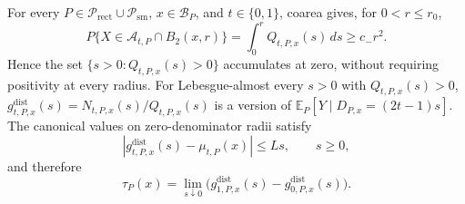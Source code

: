 For every \(P\in\mathcal{P}_{\mathrm{rect}}\cup\mathcal{P}_{\mathrm{sm}}\), \(x\in\mathcal{B}_P\), and \(t\in\{0,1\}\), coarea gives, for \(0<r\leq r_0\), \[P\{X\in\mathcal{A}_{t,P}\cap B_2(x,r)\}=\int_0^r Q_{t,P,x}(s)\,ds\geq c_{-}r^2.\] Hence the set \(\{s>0:Q_{t,P,x}(s)>0\}\) accumulates at zero, without requiring positivity at every radius. For Lebesgue-almost every \(s>0\) with \(Q_{t,P,x}(s)>0\), \(g^{\mathrm{dist}}_{t,P,x}(s)=N_{t,P,x}(s)/Q_{t,P,x}(s)\) is a version of \(\mathbb{E}_P[Y\mid D_{P,x}=(2t-1)s]\). The canonical values on zero-denominator radii satisfy \[|g^{\mathrm{dist}}_{t,P,x}(s)-\mu_{t,P}(x)|\leq Ls,\qquad s\geq0,\] and therefore \[\tau_P(x)=\lim_{s\downarrow0}\bigl(g^{\mathrm{dist}}_{1,P,x}(s)-g^{\mathrm{dist}}_{0,P,x}(s)\bigr).\]